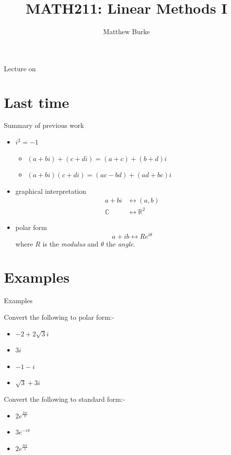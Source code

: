 \documentclass{beamer}
\title{MATH211: Linear Methods I}
\author{Matthew Burke}
\date{\lectureDate}
\newcommand{\lectureDate}{\formatdate{20}{11}{2018}}
\begin{document}
\frame{\titlepage}

\begin{frame}{Lecture on \lectureDate}
  \tableofcontents
\end{frame}

\section*{Last time}
\label{sec:Last-time}

\begin{frame}{Summary of previous work}
\begin{itemize}
	\item $i^2=-1$
	\begin{itemize}
		\item $(a+bi)+(c+di) = (a+c)+(b+d)i$
		\item $(a+bi)(c+di) = (ac -bd)+(ad+bc)i$
	\end{itemize}\vfill
	\item graphical interpretation
	\begin{align*}
		a+bi &\leftrightarrow (a, b)\\
		\mathbb{C} &\leftrightarrow \mathbb{R}^2
	\end{align*}\vfill
	\item polar form
	\begin{equation*}
		a+ib \leftrightarrow Re^{i\theta}
	\end{equation*}
	where $R$ is the \emph{modulus} and $\theta$ the \emph{angle}.
\end{itemize}
\end{frame}

\section{Examples}

\begin{frame}{Examples}
\begin{example}
Convert the following to polar form:-
\begin{itemize}
	\item $-2+2\sqrt{3}i$ %
	\item $3i$ %
	\item $-1-i$ %
	\item $\sqrt{3}+3i$ %
\end{itemize}
\end{example}
\begin{example}
Convert the following to standard form:-
\begin{itemize}
	\item $2e^{\frac{2\pi i}{3}}$ %
	\item $3e^{-i\pi}$ %
	\item $2e^{\frac{3i\pi}{4}}$ %
\end{itemize}
\end{example}
\end{frame}
\end{document}
